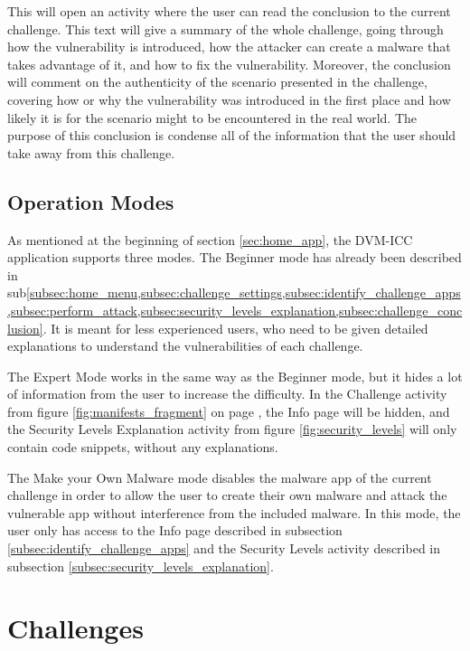     This will open an activity where the user can read the conclusion to the current challenge. This text will give a summary of the whole challenge, going through how the vulnerability is introduced, how the attacker can create a malware that takes advantage of it, and how to fix the vulnerability. Moreover, the conclusion will comment on the authenticity of the scenario presented in the challenge, covering how or why the vulnerability was introduced in the first place and how likely it is for the scenario might to be encountered in the real world. The purpose of this conclusion is condense all of the information that the user should take away from this challenge.
    
    \subsection{Operation Modes}
        \label{subsec:challenge_modes}
    
    As mentioned at the beginning of section \ref{sec:home_app}, the DVM-ICC application supports three modes. The Beginner mode has already been described in sub\cref{subsec:home_menu,subsec:challenge_settings,subsec:identify_challenge_apps,subsec:perform_attack,subsec:security_levels_explanation,subsec:challenge_conclusion}. It is meant for less experienced users, who need to be given detailed explanations to understand the vulnerabilities of each challenge.
    
    The Expert Mode works in the same way as the Beginner mode, but it hides a lot of information from the user to increase the difficulty. In the Challenge activity from figure \ref{fig:manifests_fragment} on page \pageref{fig:manifests_fragment}, the Info page will be hidden, and the Security Levels Explanation activity from figure \ref{fig:security_levels} will only contain code snippets, without any explanations.
    
    The Make your Own Malware mode disables the malware app of the current challenge in order to allow the user to create their own malware and attack the vulnerable app without interference from the included malware. In this mode, the user only has access to the Info page described in subsection \ref{subsec:identify_challenge_apps} and the Security Levels activity described in subsection \ref{subsec:security_levels_explanation}.
    
    \section{Challenges}
        \label{sec:challenges}
        
